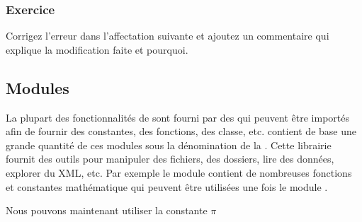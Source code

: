 \documentclass[letterpaper,10pt,english]{sphinxmanual}
\begin{document}
\begin{sphinxVerbatim}[commandchars=\\\{\}]
  

\end{sphinxVerbatim}


\subsubsection{Exercice}
\label{\detokenize{src/OCI01_Introduction:id3}}
Corrigez l’erreur dans l’affectation suivante et ajoutez un commentaire qui explique la modification faite et pourquoi.

\begin{sphinxVerbatim}[commandchars=\\\{\}]
  
\end{sphinxVerbatim}


\subsection{Modules}
\label{\detokenize{src/OCI01_Introduction:modules}}
La plupart des fonctionnalités de  sont fourni par des  qui peuvent être importés afin de fournir des constantes, des fonctions, des classe, etc.
 contient de base une grande quantité de ces modules sous la dénomination de la .
Cette librairie fournit des outils pour manipuler des fichiers, des dossiers, lire des données, explorer du XML, etc.
Par exemple le module  contient de nombreuses fonctions et constantes mathématique qui peuvent être utilisées une fois le module .

\begin{sphinxVerbatim}[commandchars=\\\{\}]
 
\end{sphinxVerbatim}

Nous pouvons maintenant utiliser la constante \(\pi\)

\begin{sphinxVerbatim}[commandchars=\\\{\}]
\end{sphinxVerbatim}
\end{document}
